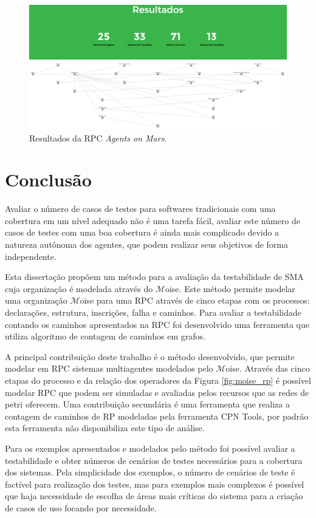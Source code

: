 \begin{figure}[ht]
\centering
\includegraphics[scale=0.28]{imagens/5-resultado2.png}
\caption{Resultados da RPC \textit{Agents on Mars}.}
\label{fig:5-resultado2}
\end{figure}




\chapter{Conclusão}
Avaliar o número de casos de testes para softwares tradicionais com uma cobertura em um nível adequado não é uma tarefa fácil, avaliar este número de casos de testes com uma boa cobertura é ainda mais complicado devido a natureza autônoma dos agentes, que podem realizar seus objetivos de forma independente.

Esta dissertação propõem um método para a avaliação da testabilidade de SMA cuja organização é modelada através do $\mathcal{M}$oise. Este método permite modelar uma organização $\mathcal{M}$oise para uma RPC através de cinco etapas com os processos: declarações, estrutura, inscrições, falha e caminhos. Para avaliar a testabilidade contando os caminhos apresentados na RPC foi desenvolvido uma ferramenta que utiliza algoritmo de contagem de caminhos em grafos.

A principal contribuição deste trabalho é o método desenvolvido, que permite modelar em RPC sistemas multiagentes modelados pelo $\mathcal{M}$oise. Através das cinco etapas do processo e da  relação dos operadores da Figura \ref{fig:moise_rp} é possível modelar RPC que podem ser simuladas e avaliadas pelos recursos que as redes de petri oferecem. Uma contribuição secundária é uma ferramenta que realiza a contagem de caminhos de RP modeladas pela ferramenta CPN Tools, por padrão esta ferramenta não disponibiliza este tipo de análise.

Para os exemplos apresentados e modelados pelo método foi possível avaliar a testabilidade e obter números de cenários de testes necessários para a cobertura dos sistemas. Pela simplicidade dos exemplos, o número de cenários de teste é factível para realização dos testes, mas para exemplos mais complexos é possível que haja necessidade de escolha de áreas mais críticas do sistema para a criação de casos de uso focando por necessidade.

